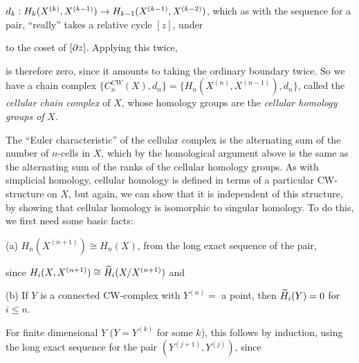 $d_k: H_k(X^{(k)},X^{(k-1)})\rightarrow H_{k-1}(X^{(k-1)},X^{(k-2)})$, which as with the sequence
for a pair, ``really'' takes a relative cycle $[z]$, under

\ssk


\ssk

 to  the coset of $[\partial z]$. Applying this twice, 

\ssk


\ssk

is therefore zero, since it amounts to taking the ordinary boundary twice. So we have a chain
complex $\{C_n^{CW}(X),d_n\}=\{H_n(X^{(n)},X^{(n-1)}),d_n\}$, called the {\it cellular chain
complex} of $X$, whose homology groups are the {\it cellular homology groups of} $X$. 

\vfill
\eject

The ``Euler characteristic'' of the cellular complex is the alternating sum of the number
of $n$-cells in $X$, which by the homological argument above is the same as the alternating 
sum of the ranks
of the cellular homology groups. As with simplicial homology, cellular homology is defined
in terms of a particular CW-structure on $X$, but again, we can show that it is independent
of this structure, by showing that cellular homology is isomorphic to singular homology. To do
this, we first need some basic facts:

\ssk

(a) $H_n(X^{(n+1)})\cong H_n(X)$, from the long exact sequence of the pair,

\ssk


\ssk

since
$H_{i}(X,X^{(n+1)})\cong \widetilde{H}_i(X/X^{(n+1)})$ and

\ssk

(b) If $Y$ is a connected CW-complex with $Y^{(n)}=$ a point, then $\widetilde{H}_i(Y)=0$ for
$i\leq n$. 

\ssk

For finite dimensional $Y$ ($Y=Y^{(k)}$ for some $k$), this follows by induction,
using the long exact sequence for the pair $(Y^{(j+1)},Y^{(j)})$, since 

